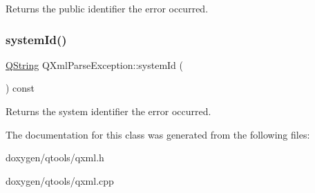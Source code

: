Returns the public identifier the error occurred. \mbox{\label{class_q_xml_parse_exception_ab4e0f0552847dcecbb18250c654d99d5}} 
\subsubsection{\texorpdfstring{systemId()}{systemId()}}
{\footnotesize\ttfamily \mbox{\hyperlink{class_q_string}{Q\+String}} Q\+Xml\+Parse\+Exception\+::system\+Id (\begin{DoxyParamCaption}{ }\end{DoxyParamCaption}) const}

Returns the system identifier the error occurred. 

The documentation for this class was generated from the following files\+:\begin{DoxyCompactItemize}
\item 
doxygen/qtools/qxml.\+h\item 
doxygen/qtools/qxml.\+cpp\end{DoxyCompactItemize}
